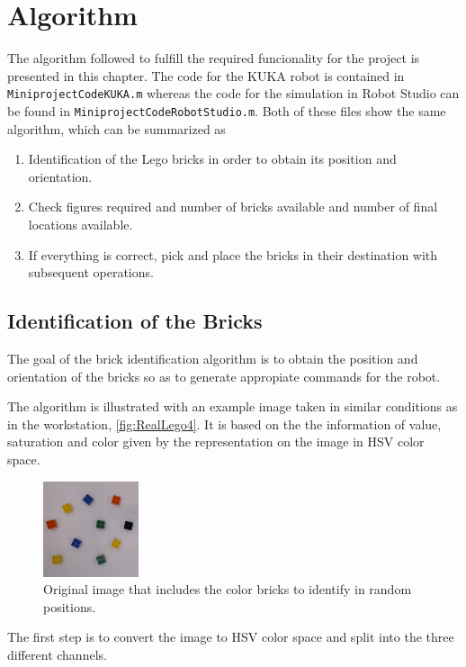 \chapter{Algorithm}\label{chap:algorithm}
The algorithm followed to fulfill the required funcionality for the project is presented in this chapter. The code for the KUKA robot is contained in \lstinline[style=matlabinline]{MiniprojectCodeKUKA.m} whereas the code for the simulation in Robot Studio can be found in \lstinline[style=matlabinline]{MiniprojectCodeRobotStudio.m}. Both of these files show the same algorithm, which can be summarized as
\begin{enumerate}
	\item Identification of the Lego bricks in order to obtain its position and orientation.
	\item Check figures required and number of bricks available and number of final locations available. 
	\item If everything is correct, pick and place the bricks in their destination with subsequent operations.
\end{enumerate}
\section{Identification of the Bricks}
The goal of the brick identification algorithm is to obtain the position and orientation of the bricks so as to generate appropiate commands for the robot.

The algorithm is illustrated with an example image taken in similar conditions as in the workstation, \autoref{fig:RealLego4}. It is based on the the information of value, saturation and color given by the representation on the image in HSV color space.

\begin{figure}[H]
	\includegraphics[width=0.25\textwidth]{figures/original.png}
	\caption{Original image that includes the color bricks to identify in random positions.}
	\label{fig:RealLego4}
\end{figure}

The first step is to convert the image to HSV color space and split into the three different channels.

